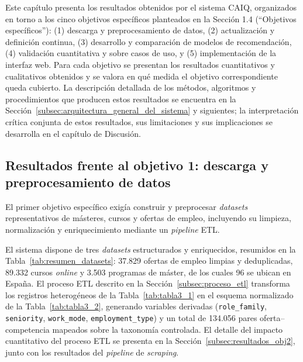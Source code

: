 Este capítulo presenta los resultados obtenidos por el sistema CAIQ, organizados en torno a los cinco objetivos específicos planteados en la Sección 1.4 (``Objetivos específicos''): (1) descarga y preprocesamiento de datos, (2) actualización y definición continua, (3) desarrollo y comparación de modelos de recomendación, (4) validación cuantitativa y sobre casos de uso, y (5) implementación de la interfaz web. Para cada objetivo se presentan los resultados cuantitativos y cualitativos obtenidos y se valora en qué medida el objetivo correspondiente queda cubierto. La descripción detallada de los métodos, algoritmos y procedimientos que producen estos resultados se encuentra en la Sección~\ref{subsec:arquitectura_general_del_sistema} y siguientes; la interpretación crítica conjunta de estos resultados, sus limitaciones y sus implicaciones se desarrolla en el capítulo de Discusión.

\subsection{Resultados frente al objetivo 1: descarga y preprocesamiento de datos}
\label{subsec:resultados_obj1}
El primer objetivo específico exigía construir y preprocesar \textit{datasets} representativos de másteres, cursos y ofertas de empleo, incluyendo su limpieza, normalización y enriquecimiento mediante un \textit{pipeline} ETL.

El sistema dispone de tres \textit{datasets} estructurados y enriquecidos, resumidos en la Tabla~\ref{tab:resumen_datasets}: 37.829 ofertas de empleo limpias y deduplicadas, 89.332 cursos \textit{online} y 3.503 programas de máster, de los cuales 96 se ubican en España. El proceso ETL descrito en la Sección~\ref{subsec:proceso_etl} transforma los registros heterogéneos de la Tabla~\ref{tab:tabla3_1} en el esquema normalizado de la Tabla~\ref{tab:tabla3_2}, generando variables derivadas (\texttt{role\_family}, \texttt{seniority}, \texttt{work\_mode}, \texttt{employment\_type}) y un total de 134.056 pares oferta--competencia mapeados sobre la taxonomía controlada. El detalle del impacto cuantitativo del proceso ETL se presenta en la Sección~\ref{subsec:resultados_obj2}, junto con los resultados del \textit{pipeline} de \textit{scraping}.

